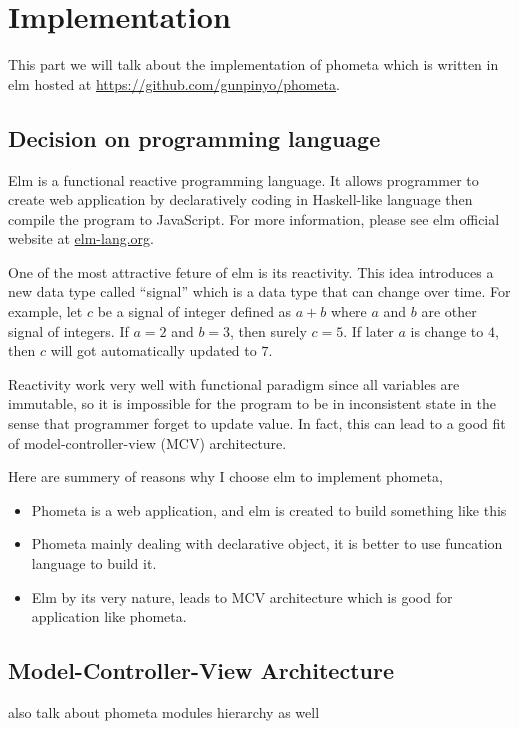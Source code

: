 \documentclass[master.tex]{subfiles}
\begin{document}
\chapter{Implementation}

This part we will talk about the implementation of phometa which is written in elm
hosted at \url{https://github.com/gunpinyo/phometa}.

\section{Decision on programming language}
Elm\supercite{elm-official-website} is a functional reactive programming
language. It allows programmer to create web application by declaratively
coding in Haskell-like language then compile the program to JavaScript. For more
information, please see elm official website at \url{elm-lang.org}.

One of the most attractive feture of elm is its reactivity. This idea introduces
a new data type called ``signal'' which is a data type that can change over
time. For example, let $c$ be a signal of integer defined as $a + b$ where $a$
and $b$ are other signal of  integers. If $a = 2$ and $b = 3$, then surely
$c = 5$. If later $a$ is change to $4$, then $c$ will got automatically updated
to $7$.

Reactivity work very well with functional paradigm since all variables are
immutable, so it is impossible for the program to be in inconsistent state in
the sense that programmer forget to update value. In fact, this can lead to a
good fit of model-controller-view (MCV) architecture.

Here are summery of reasons why I choose elm to implement phometa,
\begin{itemize}
  \item Phometa is a web application, and elm is created to build something like
    this
  \item Phometa mainly dealing with declarative object, it is better to use
    funcation  language to build it.
  \item Elm by its very nature, leads to MCV architecture which is good for
    application like phometa.
\end{itemize}

\section{Model-Controller-View Architecture}
  also talk about phometa modules hierarchy as well
\end{document}
